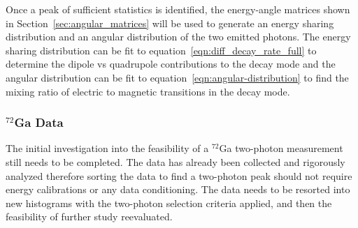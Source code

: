 \documentclass[cnatzke_thesis_proposal.tex]{subfiles}
\begin{document}
Once a peak of sufficient statistics is identified, the energy-angle matrices shown in Section~\ref{sec:angular_matrices} will be used to generate an energy sharing distribution and an angular distribution of the two emitted photons.
The energy sharing distribution can be fit to equation~\ref{eqn:diff_decay_rate_full} to determine the dipole vs quadrupole contributions to the decay mode and the angular distribution can be fit to equation~\ref{eqn:angular-distribution} to find the mixing ratio of electric to magnetic transitions in the decay mode. 

\subsubsection{$^{72}$Ga Data}
The initial investigation into the feasibility of a $^{72}$Ga two-photon measurement still needs to be completed. 
The data has already been collected and rigorously analyzed therefore sorting the data to find a two-photon peak should not require energy calibrations or any data conditioning.
The data needs to be resorted into new histograms with the two-photon selection criteria applied, and then the feasibility of further study reevaluated. 

\end{document}

